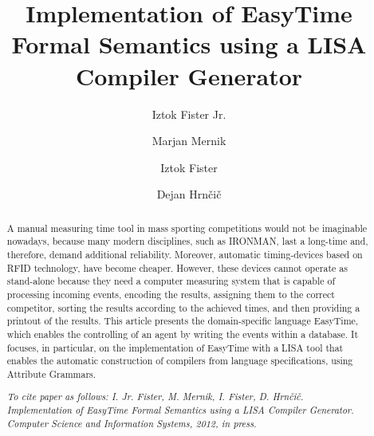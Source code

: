 \documentclass[preprint, prX]{revtex4}
\begin{document}
\begin{abstract}
A manual measuring time tool in mass sporting competitions would not be imaginable nowadays, because many modern disciplines, such as
IRONMAN, last a long-time and, therefore, demand additional reliability. Moreover, automatic timing-devices based on RFID technology,
have become cheaper. However, these devices cannot operate as stand-alone because they need a computer measuring system that is capable of processing incoming events, encoding the results, assigning them to the correct competitor, sorting the results according to the
achieved times, and then providing a printout of the results. This article presents the domain-specific language EasyTime, which enables the controlling of an agent by writing the events within a database. It focuses, in particular, on the implementation of EasyTime with a LISA tool that enables the automatic construction of compilers from language specifications, using Attribute Grammars.


\textit{To cite paper as follows: I. Jr. Fister, M. Mernik, I. Fister, D. Hrn\v{c}i\v{c}. 
Implementation of EasyTime Formal Semantics using a LISA Compiler Generator. Computer Science
and Information Systems, 2012, in press.
}

\end{abstract}

\title{Implementation of EasyTime Formal Semantics using a LISA Compiler Generator}


\author{Iztok Fister Jr.}

\author{Marjan Mernik}

\author{Iztok Fister}

\author{Dejan Hrn\v{c}i\v{c}}

\maketitle
\end{document}
